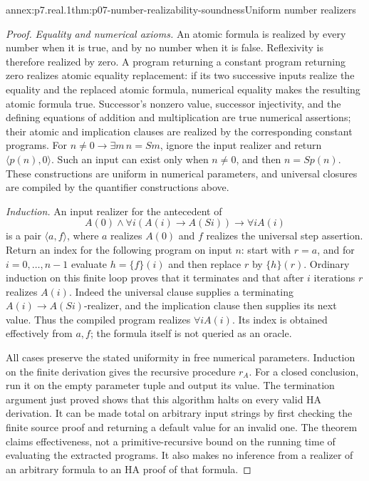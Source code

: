\begin{annexitem}{annex:p7.real.1}{thm:p07-number-realizability-soundness}{Uniform number realizers}
\begin{proof}
\emph{Equality and numerical axioms.} An atomic formula is realized
by every number when it is true, and by no number when it is false.
Reflexivity is therefore realized by zero. A program returning a
constant program returning zero realizes atomic equality replacement:
if its two successive inputs realize the equality and the replaced
atomic formula, numerical equality makes the resulting atomic formula
true. Successor's nonzero value, successor injectivity, and the defining
equations of addition and multiplication are true numerical assertions;
their atomic and implication clauses are realized by the corresponding
constant programs. For
\(n\ne0\to\exists m\,n=Sm\), ignore the input realizer and
return \(\langle p(n),0\rangle\). Such an input can exist only
when \(n\ne0\), and then \(n=Sp(n)\). These constructions are
uniform in numerical parameters, and universal closures are compiled
by the quantifier constructions above.

\emph{Induction.} An input realizer for the antecedent of
\[
 A(0)\land\forall i(A(i)\to A(Si))\to\forall iA(i)
\]
is a pair \(\langle a,f\rangle\), where \(a\) realizes \(A(0)\)
and \(f\) realizes the universal step assertion. Return an index
for the following program on input \(n\): start with \(r=a\),
and for \(i=0,\ldots,n-1\) evaluate
\(h=\{f\}(i)\) and then replace \(r\) by \(\{h\}(r)\).
Ordinary induction on this finite loop proves that it terminates and
that after \(i\) iterations \(r\) realizes \(A(i)\). Indeed the
universal clause supplies a terminating \(A(i)\to A(Si)\)-realizer,
and the implication clause then supplies its next value. Thus the
compiled program realizes \(\forall iA(i)\). Its index is obtained
effectively from \(a,f\); the formula itself is not queried as an
oracle.

All cases preserve the stated uniformity in free numerical parameters.
Induction on the finite derivation gives the recursive procedure
\(r_A\). For a closed conclusion, run it on the empty parameter
tuple and output its value. The termination argument just proved shows
that this algorithm halts on every valid HA derivation. It can be made
total on arbitrary input strings by first checking the finite source
proof and returning a default value for an invalid one. The theorem
claims effectiveness, not a primitive-recursive bound on the running
time of evaluating the extracted programs. It also makes no inference
from a realizer of an arbitrary formula to an HA proof of that formula.
\end{proof}
\end{annexitem}


